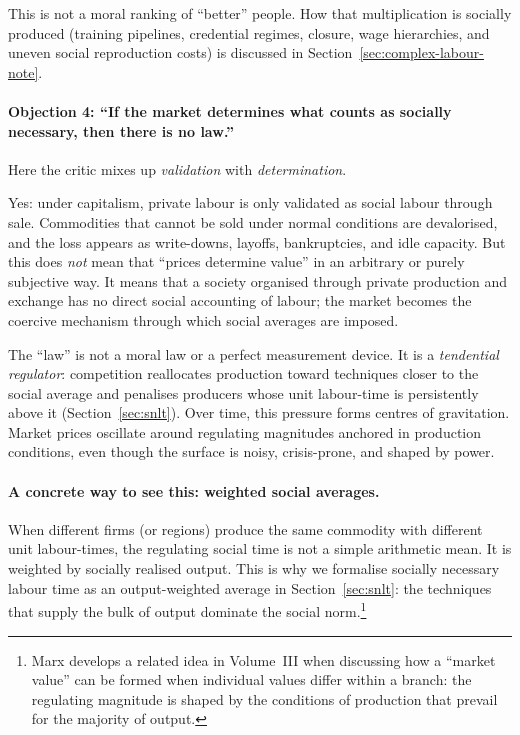This is not a moral ranking of ``better'' people.
How that multiplication is socially produced (training pipelines, credential regimes, closure, wage hierarchies,
and uneven social reproduction costs) is discussed in Section~\ref{sec:complex-labour-note}.\cite{Foley1986,Shaikh2016}


\paragraph{Objection 4: ``If the market determines what counts as socially necessary, then there is no law.''}
Here the critic mixes up \emph{validation} with \emph{determination}.

Yes: under capitalism, private labour is only validated as social labour through sale. Commodities that cannot be sold under normal conditions are devalorised,
and the loss appears as write-downs, layoffs, bankruptcies, and idle capacity.\cite{Marx1867,Shaikh2016}
But this does \emph{not} mean that ``prices determine value'' in an arbitrary or purely subjective way. It means that a society organised through private production
and exchange has no direct social accounting of labour; the market becomes the coercive mechanism through which social averages are imposed.

The ``law'' is not a moral law or a perfect measurement device. It is a \emph{tendential regulator}: competition reallocates production toward techniques closer to
the social average and penalises producers whose unit labour-time is persistently above it (Section~\ref{sec:snlt}). Over time, this pressure forms centres of
gravitation. Market prices oscillate around regulating magnitudes anchored in production conditions, even though the surface is noisy, crisis-prone, and shaped by
power.\cite{Shaikh2016}

\paragraph{A concrete way to see this: weighted social averages.}
When different firms (or regions) produce the same commodity with different unit labour-times, the regulating social time is not a simple arithmetic mean. It is
weighted by socially realised output. This is why we formalise socially necessary labour time as an output-weighted average in Section~\ref{sec:snlt}: the techniques
that supply the bulk of output dominate the social norm.\footnote{Marx develops a related idea in Volume~III when discussing how a ``market value'' can be formed when
individual values differ within a branch: the regulating magnitude is shaped by the conditions of production that prevail for the majority of output.\cite{Marx1894}}

